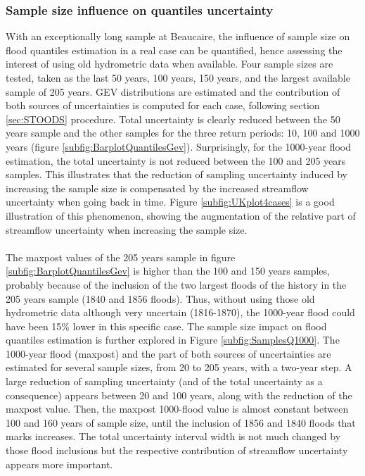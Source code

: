 \documentclass[11pt]{article}
\begin{document}
        \subsubsection{Sample size influence on quantiles uncertainty}
        
        With an exceptionally long sample at Beaucaire, the influence of sample size on flood quantiles estimation in a real case can be quantified, hence assessing the interest of using old hydrometric data when available. Four sample sizes are tested, taken as the last 50 years, 100 years, 150 years, and the largest available sample of 205 years. GEV distributions are estimated and the contribution of both sources of uncertainties is computed for each case, following section \ref{sec:STOODS} procedure.
        Total uncertainty is clearly reduced between the 50 years sample and the other samples for the three return periods: 10, 100 and 1000 years (figure \ref{subfig:BarplotQuantilesGev}). Surprisingly, for the 1000-year flood estimation, the total uncertainty is not reduced between the 100 and 205 years samples. This illustrates that the reduction of sampling uncertainty induced by increasing the sample size is compensated by the increased streamflow uncertainty when going back in time. Figure \ref{subfig:UKplot4cases} is a good illustration of this phenomenon, showing the augmentation of the relative part of streamflow uncertainty when increasing the sample size.
        
        \paragraph{}
        The maxpost values of the 205 years sample in figure \ref{subfig:BarplotQuantilesGev} is higher than the 100 and 150 years samples, probably because of the inclusion of the two largest floods of the history in the 205 years sample (1840 and 1856 floods). Thus, without using those old hydrometric data although very uncertain (1816-1870), the 1000-year flood could have been 15\% lower in this specific case. The sample size impact on flood quantiles estimation is further explored in Figure \ref{subfig:SamplesQ1000}. The 1000-year flood (maxpost) and the part of both sources of uncertainties are estimated for several sample sizes, from 20 to 205 years, with a two-year step. A large reduction of sampling uncertainty (and of the total uncertainty as a consequence) appears between 20 and 100 years, along with the reduction of the maxpost value. Then, the maxpost 1000-flood value is almost constant between 100 and 160 years of sample size, until the inclusion of 1856 and 1840 floods that marks increases. The total uncertainty interval width is not much changed by those flood inclusions but the respective contribution of streamflow uncertainty appears more important.  
        
\end{document}

